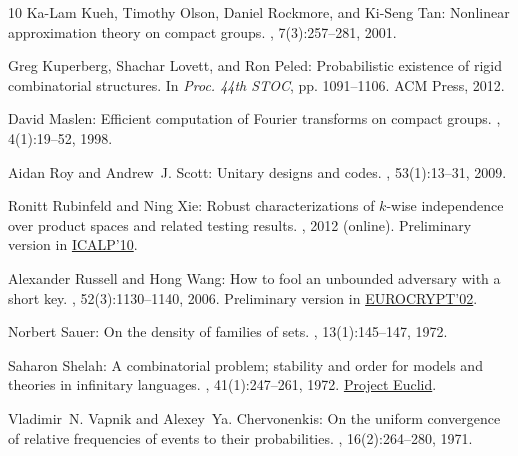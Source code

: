\begin{thebibliography}{10}
{\sc Ka-Lam Kueh, Timothy Olson, Daniel Rockmore, and Ki-Seng Tan}: Nonlinear
  approximation theory on compact groups.
, 7(3):257--281, 2001.
\newblock [\epfmtdoi{10.1007/BF02511813}]

{\sc Greg Kuperberg, Shachar Lovett, and Ron Peled}: Probabilistic existence of
  rigid combinatorial structures.
\newblock In {\em Proc. 44th STOC}, pp. 1091--1106. ACM Press, 2012.
\newblock [\epfmtdoi{10.1145/2213977.2214075}]

{\sc David Maslen}: Efficient computation of {F}ourier transforms on compact
  groups.
, 4(1):19--52, 1998.
\newblock [\epfmtdoi{10.1007/BF02475926}]

{\sc Aidan Roy and Andrew~J. Scott}: Unitary designs and codes.
, 53(1):13--31, 2009.
\newblock [\epfmtdoi{10.1007/s10623-009-9290-2}]

{\sc Ronitt Rubinfeld and Ning Xie}: Robust characterizations of $k$-wise
  independence over product spaces and related testing results.
, 2012 (online).
\newblock Preliminary version in
  \href{http://dx.doi.org/10.1007/978-3-642-14165-2\_48}{ICALP'10}.

{\sc Alexander Russell and Hong Wang}: How to fool an unbounded adversary with
  a short key.
, 52(3):1130--1140, 2006.
\newblock Preliminary version in
  \href{http://dx.doi.org/10.1007/3-540-46035-7_9}{EUROCRYPT'02}.

{\sc Norbert Sauer}: On the density of families of sets.
, 13(1):145--147, 1972.
\newblock [\epfmtdoi{10.1016/0097-3165(72)90019-2}]

{\sc Saharon Shelah}: A combinatorial problem; stability and order for models
  and theories in infinitary languages.
, 41(1):247--261, 1972.
\newblock \href{http://projecteuclid.org/euclid.pjm/1102968432}{Project
  Euclid}.

{\sc Vladimir~N. Vapnik and Alexey~Ya. Chervonenkis}: {On the uniform
  convergence of relative frequencies of events to their probabilities}.
, 16(2):264--280, 1971.
\newblock [\epfmtdoi{10.1137/1116025}]


\end{thebibliography}
